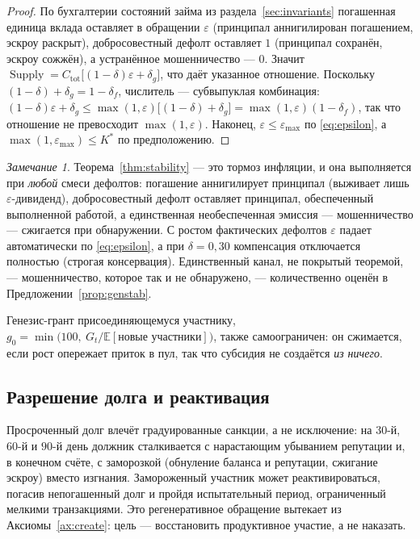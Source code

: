 \documentclass[11pt]{article}
\theoremstyle{plain}
\theoremstyle{definition}
\theoremstyle{remark}
\newtheorem{remark}{Замечание}
\newcommand{\Supply}{\operatorname{Supply}}
\begin{document}
\begin{proof}
По бухгалтерии состояний займа из раздела~\ref{sec:invariants} погашенная единица вклада оставляет в обращении $\varepsilon$ (принципал аннигилирован погашением, эскроу раскрыт), добросовестный дефолт оставляет $1$ (принципал сохранён, эскроу сожжён), а устранённое мошенничество --- $0$. Значит $\Supply = C_{\mathrm{tot}}\bigl[(1-\delta)\varepsilon+\delta_g\bigr]$, что даёт указанное отношение. Поскольку $(1-\delta)+\delta_g = 1-\delta_f$, числитель --- субвыпуклая комбинация: $(1-\delta)\varepsilon+\delta_g \le \max(1,\varepsilon)\bigl[(1-\delta)+\delta_g\bigr] = \max(1,\varepsilon)(1-\delta_f)$, так что отношение не превосходит $\max(1,\varepsilon)$. Наконец, $\varepsilon\le\varepsilon_{\max}$ по \eqref{eq:epsilon}, а $\max(1,\varepsilon_{\max})\le K^*$ по предположению.
\end{proof}

\begin{remark}
Теорема~\ref{thm:stability} --- это тормоз инфляции, и она выполняется при \emph{любой} смеси дефолтов: погашение аннигилирует принципал (выживает лишь $\varepsilon$-дивиденд), добросовестный дефолт оставляет принципал, обеспеченный выполненной работой, а единственная необеспеченная эмиссия --- мошенничество --- сжигается при обнаружении. С ростом фактических дефолтов $\varepsilon$ падает автоматически по \eqref{eq:epsilon}, а при $\delta=0{,}30$ компенсация отключается полностью (строгая консервация). Единственный канал, не покрытый теоремой, --- мошенничество, которое так и не обнаружено, --- количественно оценён в Предложении~\ref{prop:genstab}.
\end{remark}

Генезис-грант присоединяющемуся участнику, $g_0 = \min\bigl(100,\ G_t/\mathbb{E}[\text{новые участники}]\bigr)$, также самоограничен: он сжимается, если рост опережает приток в пул, так что субсидия не создаётся \emph{из ничего}.

\subsection{Разрешение долга и реактивация}

Просроченный долг влечёт градуированные санкции, а не исключение: на $30$-й, $60$-й и $90$-й день должник сталкивается с нарастающим убыванием репутации и, в конечном счёте, с заморозкой (обнуление баланса и репутации, сжигание эскроу) вместо изгнания. Замороженный участник может реактивироваться, погасив непогашенный долг и пройдя испытательный период, ограниченный мелкими транзакциями. Это регенеративное обращение вытекает из Аксиомы~\ref{ax:create}: цель --- восстановить продуктивное участие, а не наказать.
\end{document}
